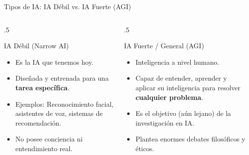 \documentclass{beamer}
\begin{document}
\begin{frame}{Tipos de IA: IA Débil vs. IA Fuerte (AGI)}
  \begin{columns}[T]
    \begin{column}{.5\textwidth}
        \begin{block}{IA Débil (Narrow AI)}
            \begin{itemize}
                \item Es la IA que tenemos hoy.
                \item Diseñada y entrenada para una \textbf{tarea específica}.
                \item Ejemplos: Reconocimiento facial, asistentes de voz, sistemas de recomendación.
                \item No posee conciencia ni entendimiento real.
            \end{itemize}
        \end{block}
    \end{column}
    \begin{column}{.5\textwidth}
        \begin{block}{IA Fuerte / General (AGI)}
            \begin{itemize}
                \item Inteligencia a nivel humano.
                \item Capaz de entender, aprender y aplicar su inteligencia para resolver \textbf{cualquier problema}.
                \item Es el objetivo (aún lejano) de la investigación en IA.
                \item Plantea enormes debates filosóficos y éticos.
            \end{itemize}
        \end{block}
    \end{column}
  \end{columns}
  
  \begin{center}
  \end{center}
\end{frame}
\end{document}
